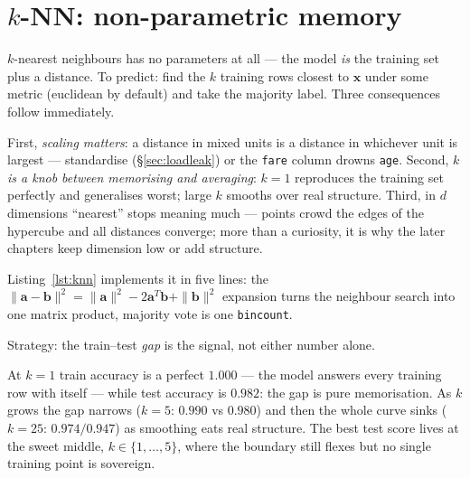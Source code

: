 \section{$k$-NN: non-parametric memory}\label{sec:knn}

$k$-nearest neighbours has no parameters at all --- the model \emph{is} the
training set plus a distance. To predict: find the $k$ training rows closest
to $\mathbf{x}$ under some metric (euclidean by default) and take the
majority label. Three consequences follow immediately.

First, \emph{scaling matters}: a distance in mixed units is a distance in
whichever unit is largest --- standardise (\S\ref{sec:loadleak}) or the
\texttt{fare} column drowns \texttt{age}. Second, \emph{$k$ is a knob between
memorising and averaging}: $k{=}1$ reproduces the training set perfectly and
generalises worst; large $k$ smooths over real structure. Third, in $d$
dimensions ``nearest'' stops meaning much --- points crowd the edges of the
hypercube and all distances converge; more
than a curiosity, it is why the later chapters keep dimension low or add
structure.

Listing~\ref{lst:knn} implements it in five lines: the
$\|\mathbf{a}-\mathbf{b}\|^2 = \|\mathbf{a}\|^2 - 2\mathbf{a}^T\mathbf{b} +
\|\mathbf{b}\|^2$ expansion turns the neighbour search into one matrix
product, majority vote is one \texttt{bincount}.





\begin{example}\label{ex:knsweep}
Strategy: the train--test \emph{gap} is the signal, not either number alone.
\par
\begin{solution}
At $k{=}1$ train accuracy is a perfect $1.000$ --- the model answers every
training row with itself --- while test accuracy is $0.982$: the gap is
pure memorisation. As $k$ grows the gap narrows ($k{=}5$: $0.990$ vs
$0.980$) and then the whole curve sinks ($k{=}25$: $0.974/0.947$) as
smoothing eats real structure. The best test score lives at the sweet
middle, $k\in\{1,\dots,5\}$, where the boundary still flexes but no single
training point is sovereign.
\end{solution}
\end{example}

